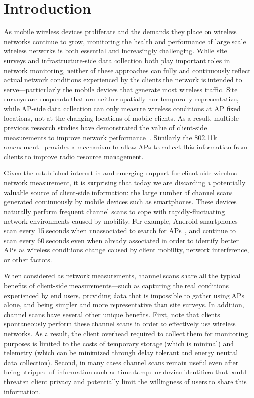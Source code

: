\section{Introduction}
\label{sec-introduction}

As mobile wireless devices proliferate and the demands they place on wireless
networks continue to grow, monitoring the health and performance of large
scale wireless networks is both essential and increasingly challenging. While
site surveys and infrastructure-side data collection both play important
roles in network monitoring, neither of these approaches can fully and
continuously reflect actual network conditions experienced by the clients the
network is intended to serve---particularly the mobile devices that generate
most wireless traffic. Site surveys are snapshots that are neither spatially nor
temporally representative, while AP-side data collection can only
measure wireless conditions at AP fixed locations, not at the changing
locations of mobile clients. As a result, multiple previous research studies
have demonstrated the value of client-side measurements to improve network
performance~\cite{mishra2005weighted,mishra2006client}. Similarly the 802.11k
amendment~\cite{80211k} provides a mechanism to allow APs to collect this
information from clients to improve radio resource management.

Given the established interest in and emerging support for client-side wireless
network measurement, it is surprising that today we are discarding a
potentially valuable source of client-side information: the large number of
channel scans generated continuously by mobile devices such as smartphones.
These devices naturally perform frequent channel scans to cope with
rapidly-fluctuating network environments caused by mobility. For example,
Android smartphones scan every 15 seconds when unassociated
to search for APs~\cite{hanover2014cutting}, and continue to scan every 60 seconds even when already associated in
order to identify better APs as wireless conditions change caused by client mobility,
network interference, or other factors.

When considered as network measurements, channel scans share all the typical benefits
of client-side measurements---such as capturing the real conditions experienced
by end users, providing data that is impossible to gather using APs alone, and
being simpler and more representative than site surveys. In addition, channel
scans have
several other unique benefits. First, note that clients spontaneously perform
these channel scans in order to effectively use wireless networks. As a result,
the client overhead required to collect them for monitoring purposes is limited
to the costs of temporary storage (which is minimal) and telemetry (which can be
minimized through delay tolerant and energy neutral data collection). Second, in
many cases channel scans remain useful even after being stripped of information
such as timestamps or device identifiers that could threaten client privacy and
potentially limit the willingness of users to share this information.

